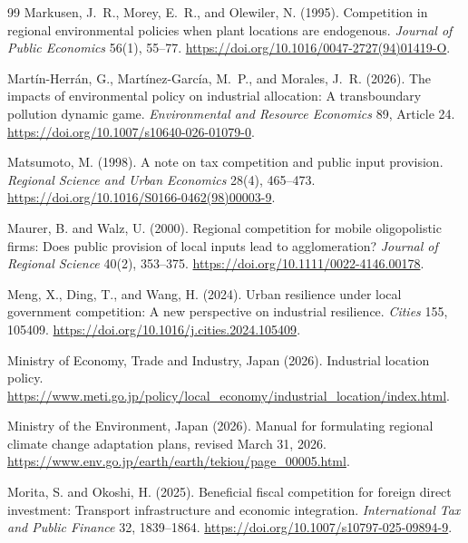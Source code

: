 \begin{thebibliography}{99}
Markusen, J.~R., Morey, E.~R., and Olewiler, N. (1995).
\newblock Competition in regional environmental policies when plant locations are endogenous.
\newblock \emph{Journal of Public Economics} 56(1), 55--77. \url{https://doi.org/10.1016/0047-2727(94)01419-O}.

Mart\'in-Herr\'an, G., Mart\'inez-Garc\'ia, M.~P., and Morales, J.~R. (2026).
\newblock The impacts of environmental policy on industrial allocation: A transboundary pollution dynamic game.
\newblock \emph{Environmental and Resource Economics} 89, Article 24. \url{https://doi.org/10.1007/s10640-026-01079-0}.

Matsumoto, M. (1998).
\newblock A note on tax competition and public input provision.
\newblock \emph{Regional Science and Urban Economics} 28(4), 465--473. \url{https://doi.org/10.1016/S0166-0462(98)00003-9}.

Maurer, B. and Walz, U. (2000).
\newblock Regional competition for mobile oligopolistic firms: Does public provision of local inputs lead to agglomeration?
\newblock \emph{Journal of Regional Science} 40(2), 353--375. \url{https://doi.org/10.1111/0022-4146.00178}.

Meng, X., Ding, T., and Wang, H. (2024).
\newblock Urban resilience under local government competition: A new perspective on industrial resilience.
\newblock \emph{Cities} 155, 105409. \url{https://doi.org/10.1016/j.cities.2024.105409}.

Ministry of Economy, Trade and Industry, Japan (2026).
\newblock Industrial location policy.
\newblock \url{https://www.meti.go.jp/policy/local_economy/industrial_location/index.html}.

Ministry of the Environment, Japan (2026).
\newblock Manual for formulating regional climate change adaptation plans, revised March 31, 2026.
\newblock \url{https://www.env.go.jp/earth/earth/tekiou/page_00005.html}.

Morita, S. and Okoshi, H. (2025).
\newblock Beneficial fiscal competition for foreign direct investment: Transport infrastructure and economic integration.
\newblock \emph{International Tax and Public Finance} 32, 1839--1864. \url{https://doi.org/10.1007/s10797-025-09894-9}.


\end{thebibliography}
